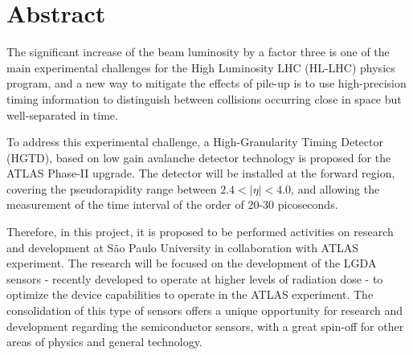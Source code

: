 \chapter*{Abstract}


The significant increase of the beam luminosity by a factor three \cite{tdr} is one of the main experimental challenges for the High Luminosity LHC (HL-LHC) physics program, and a new way to mitigate the effects of pile-up is to use high-precision timing information to distinguish between collisions occurring close in space but well-separated in time.

To address this experimental challenge, a High-Granularity Timing Detector (HGTD), based on low gain avalanche detector technology is proposed for the ATLAS Phase-II upgrade. The detector will be installed at the forward region, covering the pseudorapidity range between $2.4< |\eta| <4.0$, and allowing the measurement of the time interval of the order of 20-30 picoseconds.


Therefore, in this project, it is proposed to be performed activities on research and development at São Paulo University in collaboration with ATLAS experiment. The research will be focused on the development of the LGDA sensors - recently developed to operate at higher levels of radiation dose - to optimize the device capabilities to operate in the ATLAS experiment. The consolidation of this type of sensors offers a unique opportunity for research and development regarding the semiconductor sensors, with a great spin-off for other areas of physics and general technology.
